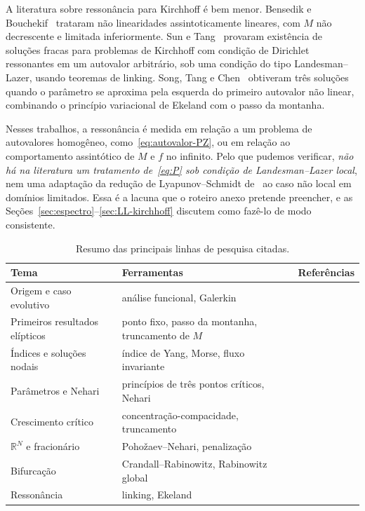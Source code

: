 \documentclass[11pt,a4paper]{article}
\theoremstyle{plain}
\theoremstyle{definition}
\theoremstyle{remark}
\newcommand{\R}{\mathbb{R}}
\begin{document}
A literatura sobre ressonância para Kirchhoff é bem menor. Bensedik e
Bouchekif~\cite{BensedikBouchekif2009} trataram não linearidades
assintoticamente lineares, com $M$ não decrescente e limitada inferiormente.
Sun e Tang~\cite{SunTang2013} provaram existência de soluções fracas para
problemas de Kirchhoff com condição de Dirichlet ressonantes em um autovalor
arbitrário, sob uma condição do tipo Landesman--Lazer, usando teoremas de
linking. Song, Tang e Chen~\cite{SongTangChen2015} obtiveram três soluções
quando o parâmetro se aproxima pela esquerda do primeiro autovalor não linear,
combinando o princípio variacional de Ekeland com o passo da montanha.

Nesses trabalhos, a ressonância é medida em relação a um problema de
autovalores homogêneo, como~\eqref{eq:autovalor-PZ}, ou em relação ao
comportamento assintótico de $M$ e $f$ no infinito. Pelo que pudemos
verificar, \emph{não há na literatura um tratamento de~\eqref{eq:P} sob
condição de Landesman--Lazer local}, nem uma adaptação da redução de
Lyapunov--Schmidt de~\cite{RezendeSanchezSilva2019} ao caso não local em
domínios limitados. Essa é a lacuna que o roteiro anexo pretende preencher, e
as Seções~\ref{sec:espectro}--\ref{sec:LL-kirchhoff} discutem como fazê-lo de
modo consistente.

\begin{table}[ht]
\centering
\small
\caption{Resumo das principais linhas de pesquisa citadas.}\label{tab:resumo}
\begin{tabular}{@{}L{3.6cm}L{5.0cm}L{5.4cm}@{}}
\toprule
\textbf{Tema} & \textbf{Ferramentas} & \textbf{Referências}\\
\midrule
Origem e caso evolutivo & análise funcional, Galerkin & \cite{Kirchhoff1883,Carrier1945,Bernstein1940,Pohozaev1975,Lions1978,ArosioPanizzi1996,DanconaSpagnolo1992}\\
Primeiros resultados elípticos & ponto fixo, passo da montanha, truncamento de $M$ & \cite{AlvesCorrea2001,MaRivera2003,AlvesCorreaMa2005,Ma2005}\\
Índices e soluções nodais & índice de Yang, Morse, fluxo invariante & \cite{PereraZhang2006,ZhangPerera2006,MaoZhang2009,HeZou2009}\\
Parâmetros e Nehari & princípios de três pontos críticos, Nehari & \cite{Ricceri2010,ChenKuoWu2011}\\
Crescimento crítico & concentração-compacidade, truncamento & \cite{AlvesCorreaFigueiredo2010,Figueiredo2013,Naimen2014}\\
$\R^N$ e fracionário & Pohožaev--Nehari, penalização & \cite{HeZou2012,LiYe2014,FiscellaValdinoci2014,AutuoriFiscellaPucci2015}\\
Bifurcação & Crandall--Rabinowitz, Rabinowitz global & \cite{AmbrosettiArcoya2017,SantosJuniorSiciliano2018,CintraEtAl2020}\\
Ressonância & linking, Ekeland & \cite{BensedikBouchekif2009,SunTang2013,SongTangChen2015}\\
\bottomrule
\end{tabular}
\end{table}
\end{document}
